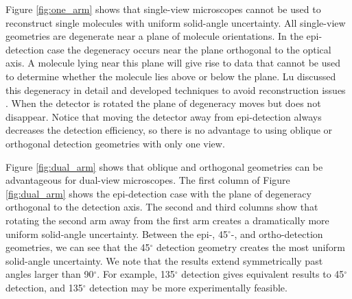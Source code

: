 \documentclass[11pt]{article}
\begin{document}
Figure \ref{fig:one_arm} shows that single-view microscopes cannot be used to
reconstruct single molecules with uniform solid-angle uncertainty. All
single-view geometries are degenerate near a plane of molecule orientations. In
the epi-detection case the degeneracy occurs near the plane orthogonal to the
optical axis. A molecule lying near this plane will give rise to data that
cannot be used to determine whether the molecule lies above or below the
plane. Lu discussed this degeneracy in detail and developed techniques to avoid
reconstruction issues \cite{lux}. When the detector is rotated the plane of
degeneracy moves but does not disappear. Notice that moving the detector away
from epi-detection always decreases the detection efficiency, so there is no
advantage to using oblique or orthogonal detection geometries with only one
view.

Figure \ref{fig:dual_arm} shows that oblique and orthogonal geometries can be
advantageous for dual-view microscopes. The first column of Figure
\ref{fig:dual_arm} shows the epi-detection case with the plane of degeneracy
orthogonal to the detection axis. The second and third columns show that
rotating the second arm away from the first arm creates a dramatically more
uniform solid-angle uncertainty. Between the epi-, 45${}^{\circ}$-, and
ortho-detection geometries, we can see that the 45${}^{\circ}$ detection
geometry creates the most uniform solid-angle uncertainty. We note that the
results extend symmetrically past angles larger than 90${}^{\circ}$. For
example, 135${}^{\circ}$ detection gives equivalent results to 45${}^{\circ}$
detection, and 135${}^{\circ}$ detection may be more experimentally feasible.
\end{document}
